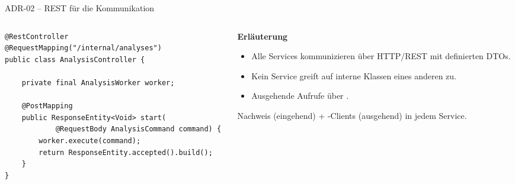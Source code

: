 \begin{frame}[fragile]{ADR-02 -- REST für die Kommunikation}
  \begin{columns}[T,onlytextwidth]
    \begin{column}{0.52\textwidth}
      \begin{lstlisting}[style=java]
@RestController
@RequestMapping("/internal/analyses")
public class AnalysisController {

    private final AnalysisWorker worker;

    @PostMapping
    public ResponseEntity<Void> start(
            @RequestBody AnalysisCommand command) {
        worker.execute(command);
        return ResponseEntity.accepted().build();
    }
}
      \end{lstlisting}
    \end{column}
    \begin{column}{0.44\textwidth}
      \textbf{Erläuterung}
      \begin{itemize}
        \item Alle Services kommunizieren über HTTP/REST mit definierten DTOs.
        \item Kein Service greift auf interne Klassen eines anderen zu.
        \item Ausgehende Aufrufe über .
      \end{itemize}
      \vspace{0.2cm}
      \begin{block}{Nachweis}
        \small {} (eingehend) + -Clients (ausgehend) in jedem Service.
      \end{block}
    \end{column}
  \end{columns}
\end{frame}

